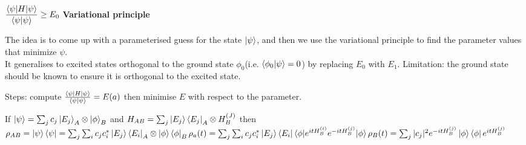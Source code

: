 \begin{squishlist}
    \item $\dfrac{\braket{\psi | H | \psi}}{\braket{\psi|\psi}} \geq E_0$ \quad \textbf{Variational principle}
    \item The idea is to come up with a parameterised guess for the state $\ket{\psi}$, and then we use the variational principle to find the parameter values that minimize $\psi$.\\
    It generalises to excited states orthogonal to the ground state $\phi_0$(i.e. $\braket{\phi_0|\psi} = 0$) by replacing $E_0$ with $E_1$.
    Limitation: the ground state should be known to ensure it is orthogonal to the excited state.
    \item Steps: compute $\frac{\braket{\psi | H | \psi}}{\braket{\psi|\psi}} = E(a)$ then minimise $E$ with respect to the parameter.
\end{squishlist}

If $\ket{\psi}  = \sum_j c_j \ket{E_j}_A \otimes \ket{\phi}_B$ and $H_{AB} = \sum_j \ket{E_j}\bra{E_j}_A \otimes H_B^{(J)}$ then \\
$\rho_{AB} = \ket{\psi} \bra{\psi} = \sum_j \sum_i c_j c_i^* \ket{E_j}\bra{E_i}_A \otimes \ket{\phi}\bra{\phi}_B \\
\rho_a(t) = \sum_j \sum_i c_j c_i^* \ket{E_j}\bra{E_i} \braket{\phi | e^{it H_B^{(i)}} e^{-it H_B^{(j)}} | \phi} \\
\rho_B(t) = \sum_j |c_j|^2 e^{-itH_B^{(j)}} \ket{\phi} \bra{\phi} e^{it H_B^{(j)}}$

